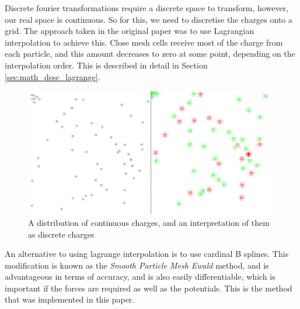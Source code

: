 \documentclass[pdftex,twoside,a4paper]{report}
\newcommand{\bcen}{\begin{center}}
\newcommand{\ecen}{\end{center}}
\begin{document}
Discrete fourier transformations require a discrete space to transform, however, our real space is continuous. So for this, we need to discretise the charges onto a grid. The approach taken in the original paper was to use Lagrangian interpolation to achieve this. Close mesh cells receive most of the charge from each particle, and this amount decreases to zero at some point, depending on the interpolation order. This is described in detail in Section \ref{sec:math_desc_lagrange}.\\
\begin{figure}
\bcen \includegraphics[width=\textwidth]{figures/Qarray.jpg} \ecen
\caption{A distribution of continuous charges, and an interpretation of them as discrete charges}
\end{figure}

An alternative to using lagrange interpolation is to use cardinal B splines. This modification is known as the \emph{Smooth Particle Mesh Ewald} method, and is advantageous in terms of accuracy, and is also easily differentiable, which is important if the forces are required as well as the potentials.  \cite{essmann:8577} This is the method that was implemented in this paper.
\end{document}
